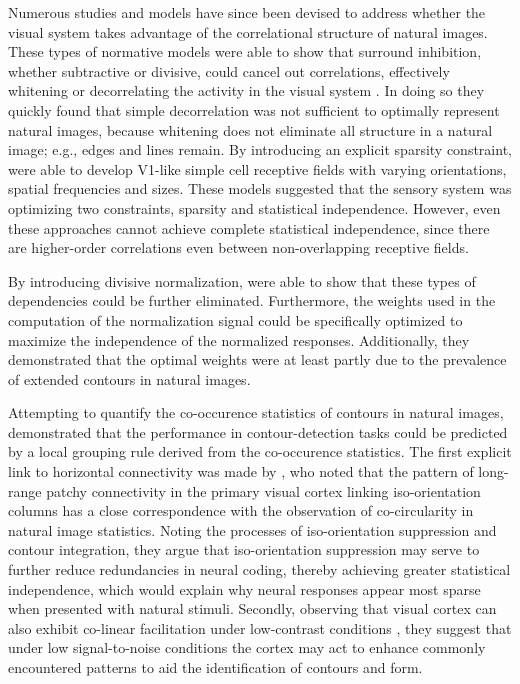 Numerous studies and models have since been devised to address whether
the visual system takes advantage of the correlational structure of
natural images. These types of normative models were able to show that
surround inhibition, whether subtractive or divisive, could cancel out
correlations, effectively whitening or decorrelating the activity in
the visual system \citep{Srinivasan1982, Atick1992}. In doing so they
quickly found that simple decorrelation was not sufficient to
optimally represent natural images, because whitening does not
eliminate all structure in a natural image; e.g., edges and lines
remain. By introducing an explicit sparsity constraint,
\cite{Olshausen1996} were able to develop V1-like simple cell
receptive fields with varying orientations, spatial frequencies and
sizes. These models suggested that the sensory system was optimizing
two constraints, sparsity and statistical independence. However, even
these approaches cannot achieve complete statistical independence,
since there are higher-order correlations even between non-overlapping
receptive fields.

By introducing divisive normalization, \cite{Schwartz2001a} were able
to show that these types of dependencies could be further
eliminated. Furthermore, the weights used in the computation of the
normalization signal could be specifically optimized to maximize the
independence of the normalized responses. Additionally, they
demonstrated that the optimal weights were at least partly due to the
prevalence of extended contours in natural images.

Attempting to quantify the co-occurence statistics of contours in
natural images, \cite{Geisler2001} demonstrated that the performance
in contour-detection tasks could be predicted by a local grouping rule
derived from the co-occurence statistics. The first explicit link to
horizontal connectivity was made by \cite{Sigman2001}, who noted that
the pattern of long-range patchy connectivity in the primary visual
cortex linking iso-orientation columns has a close correspondence with
the observation of co-circularity in natural image statistics. Noting
the processes of iso-orientation suppression and contour integration,
they argue that iso-orientation suppression may serve to further
reduce redundancies in neural coding, thereby achieving greater
statistical independence, which would explain why neural responses
appear most sparse when presented with natural stimuli. Secondly,
observing that visual cortex can also exhibit co-linear facilitation
under low-contrast conditions \citep{Sceniak1999, Kapadia1999}, they
suggest that under low signal-to-noise conditions the cortex may act
to enhance commonly encountered patterns to aid the identification of
contours and form.

